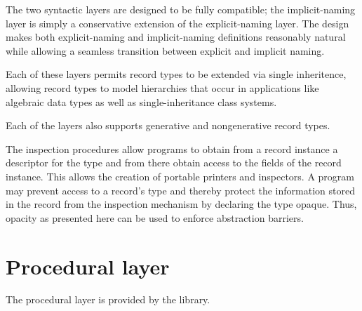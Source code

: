 The two syntactic layers are designed to be fully compatible; the
implicit-naming layer is simply a conservative extension of the
explicit-naming layer.  The design makes both explicit-naming and
implicit-naming definitions reasonably natural while allowing a seamless
transition between explicit and implicit naming.

Each of these layers permits record types to be extended via single
inheritence, allowing record types to model hierarchies that occur in
applications like algebraic data types as well as single-inheritance class
systems.

Each of the layers also supports generative and nongenerative record types.

The inspection procedures allow programs to obtain from a record instance a
descriptor for the type and from there obtain access to the fields of the
record instance. This allows the creation of portable printers and inspectors.
A program may prevent access to a record's type and thereby protect the
information stored in the record from the inspection mechanism by declaring the
type opaque. Thus, opacity as presented here can be used to enforce abstraction
barriers.

\section{Procedural layer}

The procedural layer is provided by the  library.

